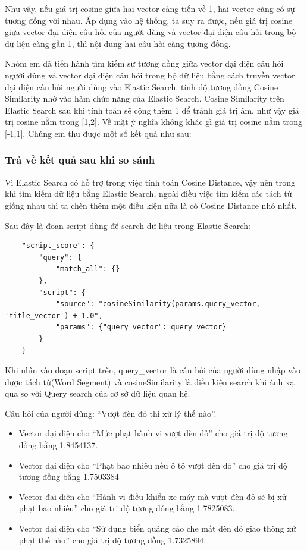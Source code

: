 Như vây, nếu giá trị cosine giữa hai vector càng tiến về 1, hai vector càng có sự tương đồng với nhau. Áp dụng vào hệ thống, ta suy ra được, nếu giá trị cosine giữa vector đại diện câu hỏi của người dùng và vector đại diện câu hỏi trong bộ dữ liệu càng gần 1, thì nội dung hai câu hỏi càng tương đồng.

Nhóm em đã tiến hành tìm kiếm sự tương đồng giữa vector đại diện câu hỏi người dùng và vector đại diện câu hỏi trong bộ dữ liệu bằng cách truyền vector đại diện câu hỏi người dùng vào Elastic Search, tính độ tương đồng Cosine Similarity nhờ vào hàm chức năng của Elastic Search. Cosine Similarity trên Elastic Search sau khi tính toán sẽ cộng thêm 1 để tránh giá trị âm, như vậy giá trị cosine nằm trong [1,2]. Về mặt ý nghĩa không khác gì giá trị cosine nằm trong [-1,1]. Chúng em thu được một số kết quả như sau:


\subsubsection {Trả về kết quả sau khi so sánh}
Vì Elastic Search có hỗ trợ trong việc tính toán Cosine Distance, vậy nên trong khi tìm kiếm dữ liệu bằng Elastic Search, ngoài điều việc tìm kiếm các tách từ giống nhau thì ta chèn thêm một điều kiện nữa là có Cosine Distance nhỏ nhất.

Sau đây là đoạn script dùng để search dữ liệu trong Elastic Search:
\begin{lstlisting}
	"script_score": {
		"query": {
			"match_all": {}
		},
		"script": {
			"source": "cosineSimilarity(params.query_vector, 'title_vector') + 1.0",
			"params": {"query_vector": query_vector}
		}
	}
\end{lstlisting}

Khi nhìn vào đoạn script trên, query\_vector là câu hỏi của người dùng nhập vào được tách từ(Word Segment) và cosineSimilarity là điều kiện search khi ánh xạ qua so với Query search của cơ sở dữ liệu quan hệ.


Câu hỏi của người dùng: “Vượt đèn đỏ thì xử lý thế nào”.
\begin{itemize}
	\item Vector đại diện cho “Mức phạt hành vi vượt đèn đỏ” cho giá trị độ tương đồng bằng 1.8454137.
	\item Vector đại diện cho “Phạt bao nhiêu nếu ô tô vượt đèn đỏ” cho giá trị độ tương đồng bằng 1.7503384
	\item Vector đại diện cho “Hành vi điều khiển xe máy mà vượt đèn đỏ sẽ bị xử phạt bao nhiêu” cho giá trị độ tương đồng bằng 1.7825083.
	\item Vector đại diện cho “Sử dụng biển quảng cáo che mất đèn đỏ giao thông xử phạt thế nào” cho giá trị độ tương đồng 1.7325894.
\end{itemize}

